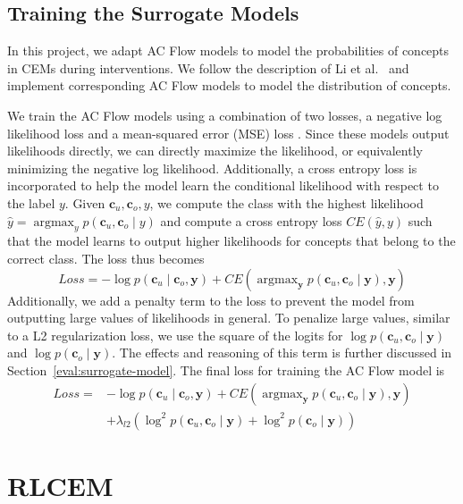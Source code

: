 \subsection{Training the Surrogate Models}\label{method:training-surrogate-model}

In this project, we adapt AC Flow models to model the probabilities of concepts in CEMs during interventions.
We follow the description of Li et al.~\cite{afa} and implement corresponding AC Flow models to model
the distribution of concepts.

We train the AC Flow models using a combination of two losses, a negative
log likelihood loss and a mean-squared error (MSE) loss . 
Since these models output likelihoods directly,
we can directly maximize the likelihood, or equivalently minimizing the negative log likelihood.
Additionally, a cross entropy loss is incorporated to help the model
learn the conditional likelihood with respect to the label $y$. 
Given $\mathbf{c}_u, \mathbf{c}_o, y$, we compute the class with the highest likelihood
$\hat{y} = \mathop{\mathrm{argmax}}_y p(\mathbf{c}_u, \mathbf{c}_o \mid y)$ and compute 
a cross entropy loss $CE(\hat{y}, y)$ such that the model learns to 
output higher likelihoods for concepts that belong to the correct class.
The loss thus becomes
\[Loss = - \log p(\mathbf{c}_u \mid \mathbf{c}_o, \mathbf{y}) +
 CE(\mathop{\mathrm{argmax}}_\mathbf{y} p(\mathbf{c}_u, \mathbf{c}_o \mid \mathbf{y}),  \mathbf{y})
\]
Additionally, we add a penalty term to the loss to prevent 
the model from outputting large values of likelihoods in general.
To penalize
large values, similar to a L2 regularization loss,
we use the square of the logits for $\log p(\mathbf{c}_u, \mathbf{c}_o \mid \mathbf{y})$ and 
$\log p(\mathbf{c}_o \mid \mathbf{y})$. The effects and reasoning of this term is further discussed in 
Section~\ref{eval:surrogate-model}. The final loss for training the
AC Flow model is
\begin{align*} 
Loss = & - \log p(\mathbf{c}_u \mid \mathbf{c}_o, \mathbf{y}) + 
CE(\mathop{\mathrm{argmax}}_\mathbf{y} p(\mathbf{c}_u, \mathbf{c}_o \mid \mathbf{y}),  \mathbf{y})
\\ & + \lambda_{l2} \left ( \log^2 p(\mathbf{c}_u, \mathbf{c}_o \mid \mathbf{y}) + 
\log^2 p(\mathbf{c}_o \mid \mathbf{y}) \right )
\end{align*}


\section{RLCEM}\label{method:rlcem}

